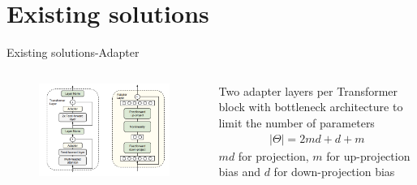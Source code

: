 \documentclass[aspectratio=169,xcolor=dvipsnames]{beamer}
\begin{document}
\section{Existing solutions}

\begin{frame}{Existing solutions-Adapter}
    \begin{columns}
        \begin{column}{0.7\textwidth}
            \begin{figure}
                \centering
                \includegraphics[width=0.9\linewidth]{figures/adapter_architecture.png}
            \end{figure}
        \end{column}
        \begin{column}{0.3\textwidth}
            Two adapter layers per Transformer block with bottleneck architecture to limit the number of parameters
            \begin{align*}
                |\Theta| = 2md + d + m
            \end{align*}
            $md$ for projection, $m$ for up-projection bias and $d$ for down-projection bias
        \end{column}
    \end{columns}
\end{frame}

\end{document}

